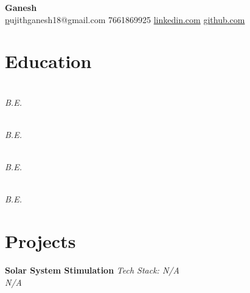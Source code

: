 \documentclass[a4paper,10pt]{article}
\begin{document}
\begin{center}
    {\huge \textbf{ Ganesh }} \\
    \vspace{5pt}
    \small \href{mailto:pujithganesh18@gmail.com } pujithganesh18@gmail.com \quad \textbullet{} 7661869925 \quad  \quad \textbullet{} \href{ https://www.linkedin.com/in/ganesh10-/ }{linkedin.com} \quad \textbullet{} \href{  }{github.com}
\end{center}

\section*{Education}

\noindent
\textbf{  } \\
\textit{ B.E. } \hfill \textit{  } \\

\vspace{0.3cm}

\noindent
\textbf{  } \\
\textit{ B.E. } \hfill \textit{  } \\

\vspace{0.3cm}

\noindent
\textbf{  } \\
\textit{ B.E. } \hfill \textit{  } \\

\vspace{0.3cm}

\noindent
\textbf{  } \\
\textit{ B.E. } \hfill \textit{  } \\

\vspace{0.3cm}



\section*{Projects}

\noindent
\textbf{ Solar System Stimulation } \hfill \textit{Tech Stack: N/A } \\
\vspace{5pt} \textit{ N/A }
\begin{compactitem}
    \item 
\end{compactitem}
\end{document}
